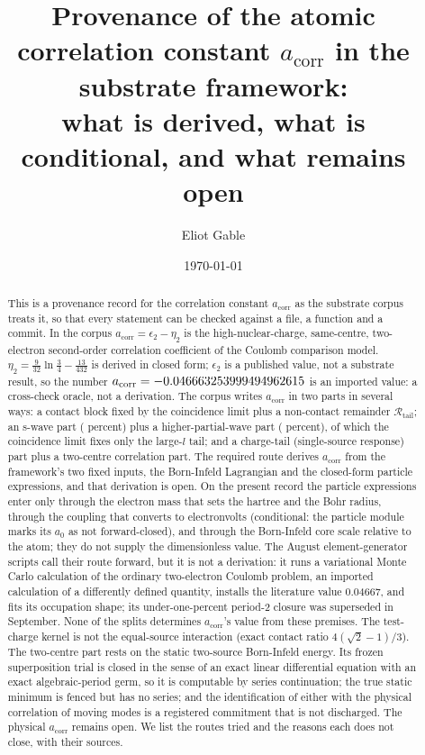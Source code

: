 \documentclass[aps,prd,onecolumn,amsmath,amssymb,longbibliography,floatfix,nofootinbib]{revtex4-2}
\newcommand{\acorr}{a_{\mathrm{corr}}}
\newcommand{\Rtail}{\mathcal{R}_{\mathrm{tail}}}
\begin{document}
\title{Provenance of the atomic correlation constant $a_{\mathrm{corr}}$ in the substrate framework:\\
what is derived, what is conditional, and what remains open}

\author{Eliot Gable}

\date{\today}

\begin{abstract}
This is a provenance record for the correlation constant $\acorr$ as the substrate corpus treats it, so that every statement can be checked against a file, a function and a commit. In the corpus $\acorr=\epsilon_2-\eta_2$ is the high-nuclear-charge, same-centre, two-electron second-order correlation coefficient of the Coulomb comparison model. $\eta_2=\tfrac{9}{32}\ln\tfrac34-\tfrac{13}{432}$ is derived in closed form; $\epsilon_2$ is a published value, not a substrate result, so the number $\acorr=\AcorrDiagVal$ is an imported value: a cross-check oracle, not a derivation. The corpus writes $\acorr$ in two parts in several ways: a contact block fixed by the coincidence limit plus a non-contact remainder $\Rtail$; an s-wave part (\SwaveFracVal{} percent) plus a higher-partial-wave part (\HigherlFracVal{} percent), of which the coincidence limit fixes only the large-$l$ tail; and a charge-tail (single-source response) part plus a two-centre correlation part. The required route derives $\acorr$ from the framework's two fixed inputs, the Born-Infeld Lagrangian and the closed-form particle expressions, and that derivation is open. On the present record the particle expressions enter only through the electron mass that sets the hartree and the Bohr radius, through the coupling that converts to electronvolts (conditional: the particle module marks its $a_0$ as not forward-closed), and through the Born-Infeld core scale relative to the atom; they do not supply the dimensionless value. The August element-generator scripts call their route forward, but it is not a derivation: it runs a variational Monte Carlo calculation of the ordinary two-electron Coulomb problem, an imported calculation of a differently defined quantity, installs the literature value 0.04667, and fits its occupation shape; its under-one-percent period-2 closure was superseded in September. None of the splits determines $\acorr$'s value from these premises. The test-charge kernel is not the equal-source interaction (exact contact ratio $4(\sqrt2-1)/3$). The two-centre part rests on the static two-source Born-Infeld energy. Its frozen superposition trial is closed in the sense of an exact linear differential equation with an exact algebraic-period germ, so it is computable by series continuation; the true static minimum is fenced but has no series; and the identification of either with the physical correlation of moving modes is a registered commitment that is not discharged. The physical $\acorr$ remains open. We list the routes tried and the reasons each does not close, with their sources.
\end{abstract}
\end{document}
